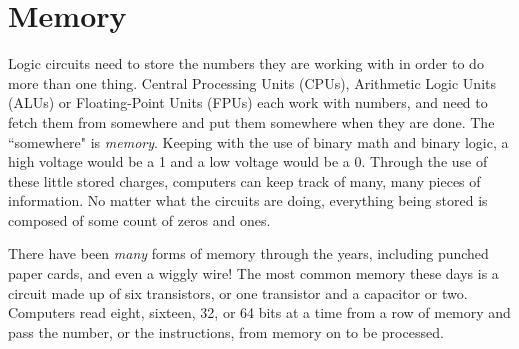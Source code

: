 \newpage
\section*{Memory}

Logic circuits need to store the numbers they are working with in order to do more than one thing. Central Processing Units (CPUs), Arithmetic Logic Units (ALUs) or Floating-Point Units (FPUs) each work with numbers, and need to fetch them from somewhere and put them somewhere when they are done. The ``somewhere" is \emph{memory}. Keeping with the use of binary math and binary logic, a high voltage would be a 1 and a low voltage would be a 0. Through the use of these little stored charges, computers can keep track of many, many pieces of information. No matter what the circuits are doing, everything being stored is composed of some count of zeros and ones. 

There have been \emph{many} forms of memory through the years, including punched paper cards, and even a wiggly wire! The most common memory these days is a circuit made up of six transistors, or one transistor and a capacitor or two. Computers read eight, sixteen, 32, or 64 bits at a time from a row of memory and pass the number, or the instructions, from memory on to be processed.

